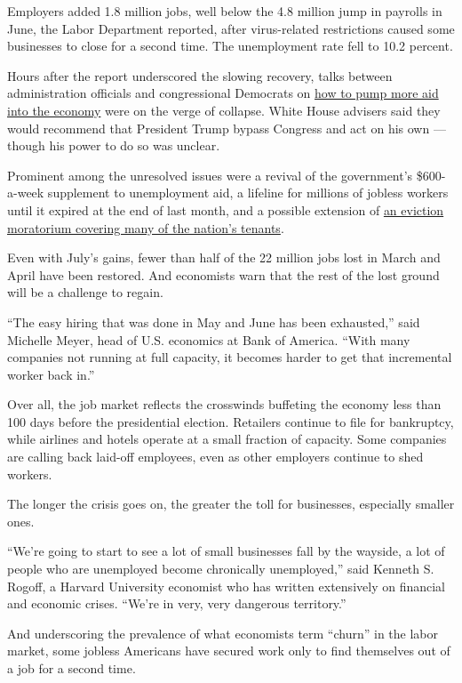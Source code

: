 Employers added 1.8 million jobs, well below the 4.8 million jump in
payrolls in June, the Labor Department reported, after virus-related
restrictions caused some businesses to close for a second time. The
unemployment rate fell to 10.2 percent.

Hours after the report underscored the slowing recovery, talks between
administration officials and congressional Democrats on
\href{https://www.nytimes3xbfgragh.onion/2020/08/07/us/politics/trump-congress-stimulus.html}{how
to pump more aid into the economy} were on the verge of collapse. White
House advisers said they would recommend that President Trump bypass
Congress and act on his own --- though his power to do so was unclear.

Prominent among the unresolved issues were a revival of the government's
\$600-a-week supplement to unemployment aid, a lifeline for millions of
jobless workers until it expired at the end of last month, and a
possible extension of
\href{https://www.nytimes3xbfgragh.onion/2020/08/07/business/economy/housing-economy-eviction-renters.html}{an
eviction moratorium covering many of the nation's tenants}.

Even with July's gains, fewer than half of the 22 million jobs lost in
March and April have been restored. And economists warn that the rest of
the lost ground will be a challenge to regain.

``The easy hiring that was done in May and June has been exhausted,''
said Michelle Meyer, head of U.S. economics at Bank of America. ``With
many companies not running at full capacity, it becomes harder to get
that incremental worker back in.''

Over all, the job market reflects the crosswinds buffeting the economy
less than 100 days before the presidential election. Retailers continue
to file for bankruptcy, while airlines and hotels operate at a small
fraction of capacity. Some companies are calling back laid-off
employees, even as other employers continue to shed workers.

The longer the crisis goes on, the greater the toll for businesses,
especially smaller ones.

``We're going to start to see a lot of small businesses fall by the
wayside, a lot of people who are unemployed become chronically
unemployed,'' said Kenneth S. Rogoff, a Harvard University economist who
has written extensively on financial and economic crises. ``We're in
very, very dangerous territory.''

And underscoring the prevalence of what economists term ``churn'' in the
labor market, some jobless Americans have secured work only to find
themselves out of a job for a second time.

